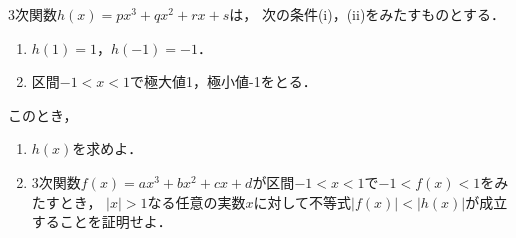 \documentclass[../../main.tex]{subfiles}
\begin{document}
3次関数$h(x)=px^3+qx^2+rx+s$は，
次の条件(i)，(ii)をみたすものとする．
\begin{enumerate}
  \item[(i)] $h(1)=1$，$h(-1)=-1$．
  \item[(ii)] 区間$-1<x<1$で極大値1，極小値-1をとる．
\end{enumerate}
このとき，
\begin{enumerate}
  \item $h(x)$を求めよ．
  \item 3次関数$f(x)=ax^3+bx^2+cx+d$が区間$-1<x<1$で$-1<f(x)<1$をみたすとき，
    $|x|>1$なる任意の実数$x$に対して不等式$|f(x)|<|h(x)|$が成立することを証明せよ．
\end{enumerate}
\end{document}
